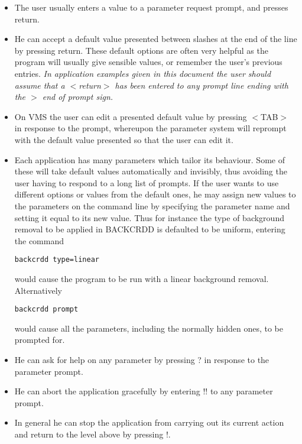 \documentclass[twoside,11pt]{article}
\begin{document}
\begin{itemize}
\item The user usually enters a value to a parameter request prompt, and presses
return.
\item He can accept a default value presented between slashes at the end
of the line by pressing return. These default options are often very
helpful as the program will usually give sensible values, or remember the
user's previous entries. {\em In application examples given in this document
the user should assume that a $<$return$>$ has been entered to any prompt line
ending with the $>$ end of prompt sign.}
\item On VMS the user can edit a presented default value by pressing $<$TAB$>$
in response to the prompt, whereupon the parameter system will reprompt with
the default value presented so that the user can edit it.
\item Each application has many parameters which tailor its behaviour. Some of
these will take default values automatically and invisibly, thus avoiding the
user having to respond to a long list of prompts. If the user wants to use
different options or values from the default ones, he may assign new values to
the parameters on the command line by specifying the parameter name and setting
it equal to its new value. Thus for instance the type of background removal to
be applied in BACKCRDD is defaulted to be uniform, entering the command
\begin{small}
\begin{verbatim}
backcrdd type=linear
\end{verbatim}
\end{small}
would cause the program to be run with a linear background removal. 
Alternatively 
\begin{small}
\begin{verbatim}
backcrdd prompt
\end{verbatim}
\end{small}
would cause all the parameters, including the normally hidden ones, to be
prompted for.
\item He can ask for help on any parameter by pressing ? in response to
the parameter prompt. 
\item He can abort the application gracefully by entering !! to any 
parameter prompt.
\item In general he can stop the application from carrying out its current
action and return to the level above by pressing !. 
\end{itemize}
\end{document}
